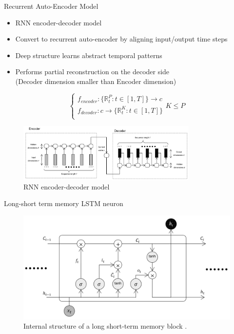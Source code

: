 \documentclass{beamer}
\begin{document}
\begin{frame}[shrink]{Recurrent Auto-Encoder Model}
  \begin{itemize}
    \item RNN encoder-decoder model
    \item Convert to recurrent auto-encoder by aligning input/output time steps
    \item Deep structure learns abstract temporal patterns
    \item Performs partial reconstruction on the decoder side
    \\ (Decoder dimension smaller than Encoder dimension)
  \end{itemize}
  \[
    \begin{cases} 
      f_{encoder} : \{ \mathbb{R}_t^P:t \in [1, T] \} \rightarrow c \\
      f_{decoder} : c \rightarrow \{ \mathbb{R}_t^K:t \in [1, T] \} \\
    \end{cases} K \leqslant P
  \]
  \begin{figure}
    \centering
    \includegraphics[width=0.8\textwidth]{seq2seq.PNG}
    \caption{RNN encoder-decoder model}
  \end{figure}
\end{frame}

\begin{frame}{Long-short term memory}
LSTM neuron \cite{hochreiter1997}
  \begin{figure}[H]
  	\centering
  	\includegraphics[width=1\textwidth]{lstm.PNG}
  	\caption{Internal structure of a long short-term memory block \cite{olah}.}
  \end{figure}
\end{frame}
\end{document}
